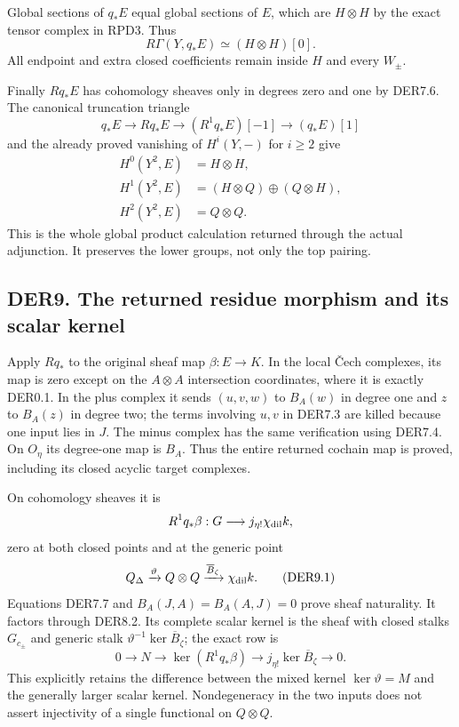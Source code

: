 Global sections of \(q_*E\) equal global sections of \(E\), which are
\(H\otimes H\) by the exact tensor complex in RPD3. Thus \[
R\Gamma(Y,q_*E)\simeq(H\otimes H)[0].
\tag{DER8.6}
\] All endpoint and extra closed coefficients remain inside \(H\) and
every \(W_\pm\).

Finally \(Rq_*E\) has cohomology sheaves only in degrees zero and one by
DER7.6. The canonical truncation triangle \[
q_*E\to Rq_*E\to(R^1q_*E)[-1]\to(q_*E)[1]
\] and the already proved vanishing of \(H^i(Y,-)\) for \(i\geq2\) give
\[
\begin{aligned}
H^0(Y^2,E)&=H\otimes H,\\
H^1(Y^2,E)&=(H\otimes Q)\oplus(Q\otimes H),\\
H^2(Y^2,E)&=Q\otimes Q.
\end{aligned}
\tag{DER8.7}
\] This is the whole global product calculation returned through the
actual adjunction. It preserves the lower groups, not only the top
pairing.

\subsection{DER9. The returned residue morphism and its scalar
kernel}\label{der9.-the-returned-residue-morphism-and-its-scalar-kernel}

Apply \(Rq_*\) to the original sheaf map \(\beta:E\to K\). In the local
Čech complexes, its map is zero except on the \(A\otimes A\)
intersection coordinates, where it is exactly DER0.1. In the plus
complex it sends \((u,v,w)\) to \(B_A(w)\) in degree one and \(z\) to
\(B_A(z)\) in degree two; the terms involving \(u,v\) in DER7.3 are
killed because one input lies in \(J\). The minus complex has the same
verification using DER7.4. On \(O_\eta\) its degree-one map is \(B_A\).
Thus the entire returned cochain map is proved, including its closed
acyclic target complexes.

On cohomology sheaves it is \[
R^1q_*\beta:G\longrightarrow j_{\eta!}\chi_{\rm dil}k,
\] zero at both closed points and at the generic point \[
Q_\Delta\xrightarrow{\vartheta}Q\otimes Q
 \xrightarrow{\overline B_\zeta}\chi_{\rm dil}k.
\tag{DER9.1}
\] Equations DER7.7 and \(B_A(J,A)=B_A(A,J)=0\) prove sheaf naturality.
It factors through DER8.2. Its complete scalar kernel is the sheaf with
closed stalks \(G_{c_\pm}\) and generic stalk
\(\vartheta^{-1}\ker\overline B_\zeta\); the exact row is \[
0\to N\longrightarrow\ker(R^1q_*\beta)
 \longrightarrow j_{\eta!}\ker\overline B_\zeta\to0.
\tag{DER9.2}
\] This explicitly retains the difference between the mixed kernel
\(\ker\vartheta=M\) and the generally larger scalar kernel.
Nondegeneracy in the two inputs does not assert injectivity of a single
functional on \(Q\otimes Q\).

